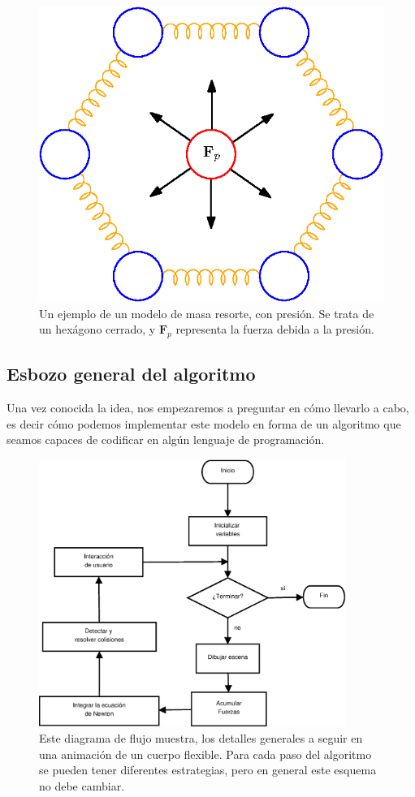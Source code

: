 \begin{figure}
 \centering
 \includegraphics[]{Img/02/modelo}
 \caption[Diagrama del modelo masa, resorte, y presión]{ 
 Un ejemplo de un modelo de masa resorte, con presión. Se trata de un hexágono cerrado, y $\textbf{F}_p$ representa la fuerza debida a la presión.
 } \label{modelo:fig}
\end{figure}

\subsection{Esbozo general del algoritmo}
Una vez conocida la idea, nos empezaremos a preguntar en cómo llevarlo a cabo, es decir cómo podemos implementar este modelo en forma de un algoritmo que seamos capaces de codificar en algún lenguaje de programación.


\begin{figure}
 \centering
 \includegraphics[width=10cm]{Img/02/diagrama_flujo}
 \caption[Diagrama de flujo de la simulación]{ 
 Este diagrama de flujo muestra, los detalles generales a seguir en una animación de un cuerpo flexible. Para cada paso del algoritmo se pueden tener diferentes estrategias, pero en general este esquema no debe cambiar.
 } \label{diagrama_flujo:fig}
\end{figure}

